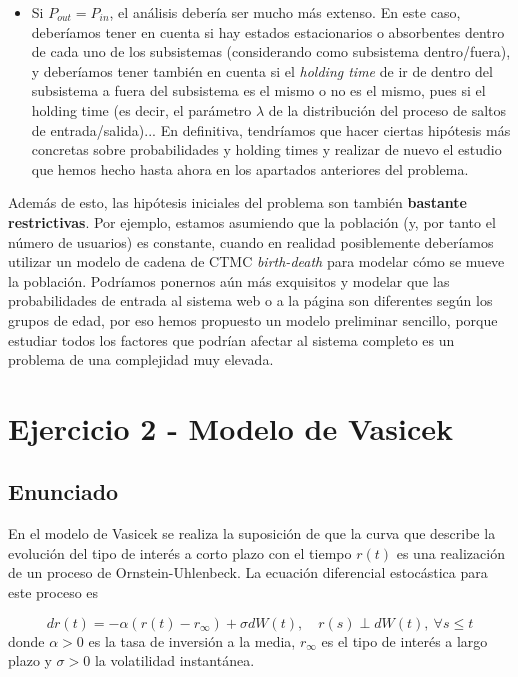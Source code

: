\documentclass[a4paper]{article}
\begin{document}
\begin{enumerate}[label=(\alph*)]
\begin{itemize}
                \item Si $P_{out} = P_{in}$, el análisis debería ser mucho más extenso. En este caso, deberíamos tener en cuenta si hay estados estacionarios o absorbentes dentro de cada uno de los subsistemas (considerando como subsistema dentro/fuera), y deberíamos tener también en cuenta si el \emph{holding time} de ir de dentro del subsistema a fuera del subsistema es el mismo o no es el mismo, pues si el holding time (es decir, el parámetro $\lambda$ de la distribución del proceso de saltos de entrada/salida)... En definitiva, tendríamos que hacer ciertas hipótesis más concretas sobre probabilidades y holding times y realizar de nuevo el estudio que hemos hecho hasta ahora en los apartados anteriores del problema.
        \end{itemize}

        Además de esto, las hipótesis iniciales del problema son también \textbf{bastante restrictivas}. Por ejemplo, estamos asumiendo que la población (y, por tanto el número de usuarios) es constante, cuando en realidad posiblemente deberíamos utilizar un modelo de cadena de CTMC \emph{birth-death} para modelar cómo se mueve la población. Podríamos ponernos aún más exquisitos y modelar que las probabilidades de entrada al sistema web o a la página son diferentes según los grupos de edad, por eso hemos propuesto un modelo preliminar sencillo, porque estudiar todos los factores que podrían afectar al sistema completo es un problema de una complejidad muy elevada.
\end{enumerate}

\section*{Ejercicio 2 - Modelo de Vasicek}

\subsection*{Enunciado}

En el modelo de Vasicek se realiza la suposición de que la curva que describe la evolución del tipo de interés a corto plazo con el tiempo $r(t)$ es una realización de un proceso de Ornstein-Uhlenbeck. La ecuación diferencial estocástica para este proceso es

\begin{equation}\label{sde}
  d r(t) = - \alpha(r(t) - r_{\infty}) + \sigma dW(t), \quad r(s) \perp dW(t), \ \forall s \leq t
\end{equation}
donde $\alpha > 0$ es la tasa de inversión a la media, $r_{\infty}$ es el tipo de interés a largo plazo y $\sigma > 0$ la volatilidad instantánea.
\end{document}

